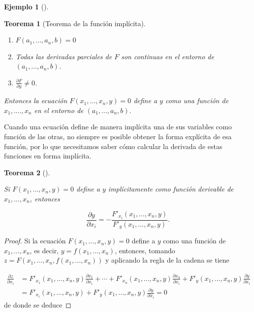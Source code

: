 \documentclass[
  a4paper,
]{scrreport}
\providecommand{\tightlist}{%
  \setlength{\itemsep}{0pt}\setlength{\parskip}{0pt}}\usepackage{longtable,booktabs,array}
\theoremstyle{definition}
\newtheorem{example}{Ejemplo}[chapter]
\theoremstyle{plain}
\theoremstyle{definition}
\theoremstyle{definition}
\theoremstyle{plain}
\newtheorem{theorem}{Teorema}[chapter]
\theoremstyle{plain}
\theoremstyle{remark}
\begin{document}
\begin{example}[]
\begin{theorem}[Teorema de la función
implícita]
\begin{enumerate}
\def\labelenumi{\alph{enumi}.}
\tightlist
\item
  \(F(a_1,\ldots,a_n,b)=0\)
\item
  Todas las derivadas parciales de \(F\) son continuas en el entorno de
  \((a_1,\ldots,a_n,b)\).
\item
  \(\frac{\partial F}{\partial y}\neq 0\).
\end{enumerate}

Entonces la ecuación \(F(x_1,\ldots,x_n,y)=0\) define a \(y\) como una
función de \(x_1, .\ldots, x_n\) en el entorno de
\((a_1,\ldots,a_n,b)\).

\end{theorem}

Cuando una ecuación define de manera implícita una de sus variables como
función de las otras, no siempre es posible obtener la forma explícita
de esa función, por lo que necesitamos saber cómo calcular la derivada
de estas funciones en forma implícita.

\begin{theorem}[]\protect\hypertarget{thm-derivada-implicita-funcion-varias-variables}{}\label{thm-derivada-implicita-funcion-varias-variables}

Si \(F(x_1,\ldots,x_n,y)=0\) define a \(y\) implícitamente como función
derivable de \(x_1,\ldots,x_n\), entonces

\[
\frac{\partial y}{\partial x_i} = -\frac{F'_{x_i}(x_1,\ldots,x_n,y)}{F'_{y}(x_1,\ldots,x_n,y)}.
\]

\end{theorem}

\begin{tcolorbox}[enhanced jigsaw, leftrule=.75mm, colbacktitle=quarto-callout-note-color!10!white, toprule=.15mm, opacityback=0, opacitybacktitle=0.6, toptitle=1mm, breakable, bottomtitle=1mm, colframe=quarto-callout-note-color-frame, rightrule=.15mm, titlerule=0mm, title=\textcolor{quarto-callout-note-color}{\faInfo}\hspace{0.5em}{Demostración}, arc=.35mm, left=2mm, bottomrule=.15mm, colback=white, coltitle=black]

\begin{proof}
Si la ecuación \(F(x_1,\ldots,x_n,y)=0\) define a \(y\) como una función
de \(x_1, \ldots, x_n\), es decir, \(y=f(x_1,\ldots,x_n)\), entonces,
tomando \(z=F(x_1,\ldots,x_n,f(x_1,\ldots,x_n))\) y aplicando la regla
de la cadena se tiene

\begin{align*}
\frac{\partial z}{\partial x_i} 
&= F'_{x_1}(x_1,\ldots,x_n,y)\frac{\partial x_1}{\partial x_i} + \cdots + F'_{x_n}(x_1,\ldots,x_n,y)\frac{\partial x_n}{\partial x_i} + F'_{y}(x_1,\ldots,x_n,y)\frac{\partial y}{\partial x_i} \\
&= F'_{x_i}(x_1,\ldots,x_n,y) + F'_{y}(x_1,\ldots,x_n,y)\frac{\partial y}{\partial x_i} = 0
\end{align*} de donde se deduce


\end{proof}
\end{tcolorbox}
\end{example}
\end{document}
